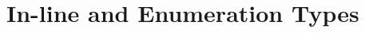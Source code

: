 \documentclass[11pt,twoside]{book}
\begin{document}

\chapter{In-line and Enumeration Types}\label{enumtypes}
\end{document}
